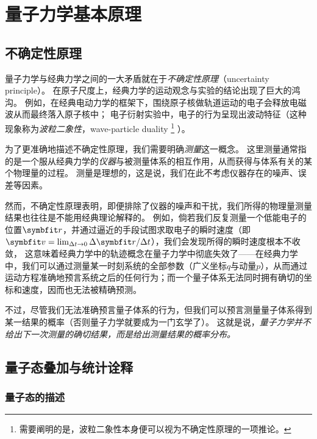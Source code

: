 
\section{量子力学基本原理}

\subsection{不确定性原理}
\label{subsec:principles_uncertainty}

量子力学与经典力学之间的一大矛盾就在于\emph{不确定性原理}（uncertainty principle）。
在原子尺度上，经典力学的运动观念与实验的结论出现了巨大的鸿沟。
例如，在经典电动力学的框架下，围绕原子核做轨道运动的电子会释放电磁波从而最终落入原子核中；
电子衍射实验中，电子的行为呈现出波动特征（这种现象称为\emph{波粒二象性}，wave-particle duality
\footnote{需要阐明的是，波粒二象性本身便可以视为不确定性原理的一项推论。}
）。

为了更准确地描述不确定性原理，我们需要明确\emph{测量}这一概念。
这里测量通常指的是一个服从经典力学的\emph{仪器}与被测量体系的相互作用，从而获得与体系有关的某个物理量的过程。
测量是理想的，这是说，我们在此不考虑仪器存在的噪声、误差等因素。

然而，不确定性原理表明，即便排除了仪器的噪声和干扰，我们所得的物理量测量结果也往往是不能用经典理论解释的。
例如，倘若我们反复测量一个低能电子的位置$\rr$，并通过逼近的手段试图求取电子的瞬时速度（即$\bm{v}=\lim_{\Delta t\rightarrow 0}\Delta\rr/\Delta t$），我们会发现所得的瞬时速度根本不收敛，
这意味着经典力学中的轨迹概念在量子力学中彻底失效了——在经典力学中，我们可以通过测量某一时刻系统的全部参数（广义坐标$q$与动量$p$），从而通过运动方程准确地预言系统之后的任何行为；而一个量子体系无法同时拥有确切的坐标和速度，因而也无法被精确预测。

不过，尽管我们无法准确预言量子体系的行为，但我们可以预言测量量子体系得到某一结果的概率（否则量子力学就要成为一门玄学了）。
这就是说，\emph{量子力学并不给出下一次测量的确切结果，而是给出测量结果的概率分布。}


\subsection{量子态叠加与统计诠释}
\label{subsec:principles_quantum_state}

\subsubsection{量子态的描述}

